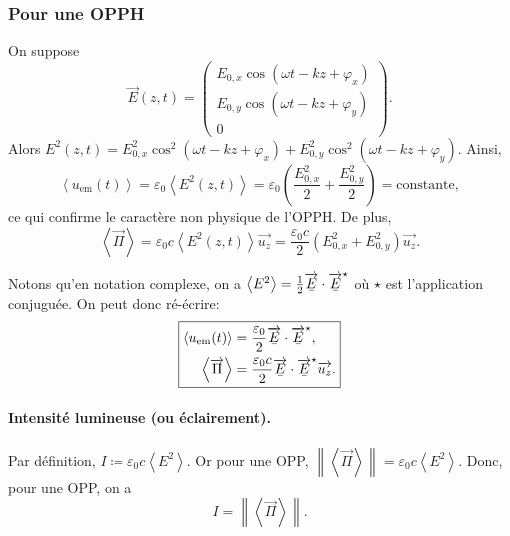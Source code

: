 \subsubsection{Pour une OPPH}

On suppose
\begin{equation*}
    \vec{E}(z,t)=\begin{pmatrix}
        E_{0,x}\cos\left(\omega t-kz+\varphi_x\right)\\
        E_{0,y}\cos\left(\omega t-kz+\varphi_y\right)\\
        0
    \end{pmatrix}.
\end{equation*}
Alors $E^{2}(z,t)=E_{0,x}^{2}\cos^{2}(\omega t-kz+\varphi_x)+E_{0,y}^{2}\cos^{2}(\omega t-kz+\varphi_y)$. Ainsi,
\begin{equation*}
    \boxed{
        \left\langle u_{\mathrm{em}}(t)\right\rangle=\varepsilon_0\left\langle E^{2}(z,t)\right\rangle=\varepsilon_0\left(\frac{E_{0,x}^{2}}{2}+\frac{E_{0,y}^{2}}{2}\right)=\mathrm{constante},
    }
\end{equation*}
ce qui confirme le caractère non physique de l'OPPH. De plus,
\begin{equation*}
    \boxed{
        \left\langle\vec{\Pi}\right\rangle=\varepsilon_0c\left\langle E^{2}(z,t)\right\rangle\vec{u_z}=\frac{\varepsilon_0c}{2}\left(E_{0,x}^{2}+E_{0,y}^{2}\right)\vec{u_z}.
    }
\end{equation*}

Notons qu'en notation complexe, on a $\left\langle E^{2}\right\rangle=\frac{1}{2}\ubar{\vec{E}}\cdot\ubar{\vec{E}}^{\star}$ où $\star$ est l'application conjuguée. On peut donc ré-écrire:
\begin{equation*}
    \boxed{
        \begin{aligned}
            \left\langle u_{\mathrm{em}}(t)\right\rangle &= \frac{\varepsilon_0}{2}\ubar{\vec{E}}\cdot\ubar{\vec{E}}^{\star},\\
            \left\langle \vec{\Pi}\right\rangle &= \frac{\varepsilon_0c}{2}\ubar{\vec{E}}\cdot\ubar{\vec{E}}^{\star}\vec{u_z}.
        \end{aligned}
    }
\end{equation*}

\paragraph{Intensité lumineuse (ou éclairement).} Par définition, $I\coloneqq\varepsilon_0c\left\langle E^{2}\right\rangle$. Or pour une OPP, $\left\lVert\left\langle\vec{\Pi}\right\rangle\right\rVert=\varepsilon_0c\left\langle E^{2}\right\rangle$. Donc, pour une OPP, on a 
\begin{equation*}
    \boxed{
        I=\left\lVert\left\langle\vec{\Pi}\right\rangle\right\rVert.
    }
\end{equation*}

